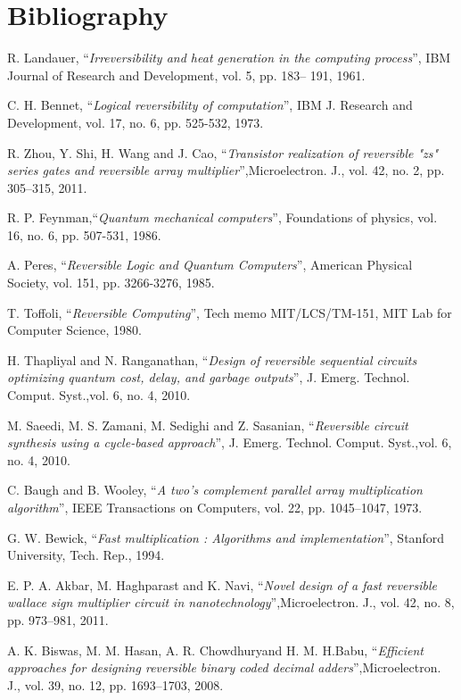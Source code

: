 	\section*{Bibliography}
	
	\noindent [1] R. Landauer, ``\textit{Irreversibility and heat generation in the computing process}'', IBM Journal of Research and Development, vol. 5, pp. 183-- 191, 1961.
	
	\noindent [2] C. H. Bennet, ``\textit{Logical reversibility of computation}'', IBM J. Research and Development, vol. 17, no. 6, pp. 525-532, 1973.
	
	\noindent [3] R. Zhou, Y. Shi, H. Wang and J. Cao, ``\textit{Transistor realization of reversible "zs" series gates and reversible array multiplier}'',Microelectron. J., vol. 42, no. 2, pp. 305--315, 2011. 
	
	\noindent [4] R. P. Feynman,``\textit{Quantum mechanical computers}'', Foundations of physics, vol. 16, no. 6, pp. 507-531, 1986.
	
	\noindent [5] A. Peres, ``\textit{Reversible Logic and Quantum Computers}'', American Physical Society, vol. 151, pp. 3266-3276, 1985.
	
	\noindent [6] T. Toffoli, ``\textit{Reversible Computing}'', Tech memo MIT/LCS/TM-151, MIT Lab for Computer Science, 1980.
	
	\noindent [7] H. Thapliyal and N. Ranganathan, ``\textit{Design of reversible sequential circuits optimizing quantum cost, delay, and garbage outputs}'', J. Emerg. Technol. Comput. Syst.,vol. 6, no. 4, 2010.
	
	\noindent [8] M. Saeedi, M. S. Zamani, M. Sedighi and Z. Sasanian, ``\textit{Reversible circuit synthesis using a cycle-based approach}'', J. Emerg. Technol. Comput. Syst.,vol. 6, no. 4, 2010.
	
	\noindent [9] C. Baugh and B. Wooley, ``\textit{A two's complement parallel array multiplication algorithm}'', IEEE Transactions on Computers, vol. 22, pp. 1045--1047, 1973.
	
	\noindent [10] G. W. Bewick, ``\textit{Fast multiplication : Algorithms and implementation}'', Stanford University, Tech. Rep., 1994. 
	
	\noindent [11] E. P. A. Akbar, M. Haghparast and K. Navi, ``\textit{Novel design of a fast reversible wallace sign multiplier circuit in nanotechnology}'',Microelectron. J., vol. 42, no. 8, pp. 973--981, 2011. 
	
	\noindent [12] A. K. Biswas, M. M. Hasan, A. R. Chowdhuryand H. M. H.Babu, ``\textit{Efficient approaches for designing reversible binary coded decimal adders}'',Microelectron. J., vol. 39, no. 12, pp. 1693--1703, 2008. 
	
